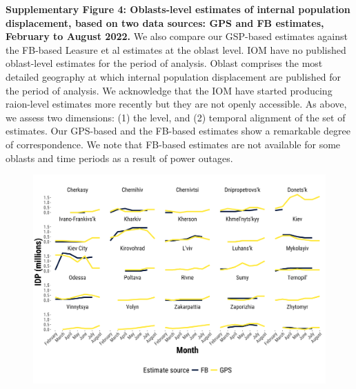 \documentclass[
  11pt,
]{article}
\begin{document}
\newpage

\textbf{Supplementary Figure 4: Oblasts-level estimates of internal
population displacement, based on two data sources: GPS and FB
estimates, February to August 2022.} We also compare our GSP-based
estimates against the FB-based Leasure et al estimates at the oblast
level. IOM have no published oblast-level estimates for the period of
analysis. Oblast comprises the most detailed geography at which internal
population displacement are published for the period of analysis. We
acknowledge that the IOM have started producing raion-level estimates
more recently but they are not openly accessible. As above, we assess
two dimensions: (1) the level, and (2) temporal alignment of the set of
estimates. Our GPS-based and the FB-based estimates show a remarkable
degree of correspondence. We note that FB-based estimates are not
available for some oblasts and time periods as a result of power
outages.

\begin{figure}[h]

\begin{minipage}{\linewidth}

\includegraphics{../outputs/sm/plot_oblast.png}

\end{minipage}%

\end{figure}%

\newpage
\end{document}
